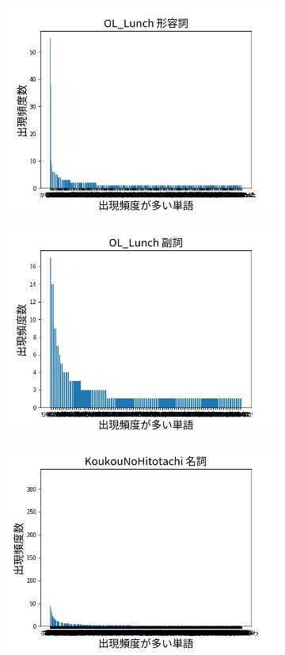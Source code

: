\documentclass[onecolumn]{ujarticle}   %
\begin{document}
\begin{figure}[hb]
\begin{subfigure}{0.49\columnwidth}
			\includegraphics[width=1.0\columnwidth]{data/keiyosi_OL_Lunch.png}
		\end{subfigure}
		\begin{subfigure}{0.49\columnwidth}
			\centering
			\includegraphics[width=1.0\columnwidth]{data/hukusi_OL_Lunch.png}
		\end{subfigure}
		\begin{subfigure}{0.49\columnwidth}
			\centering
			\includegraphics[width=1.0\columnwidth]{data/meisi_KoukouNoHitotachi.png}

\end{subfigure}
\end{figure}
\end{document}

